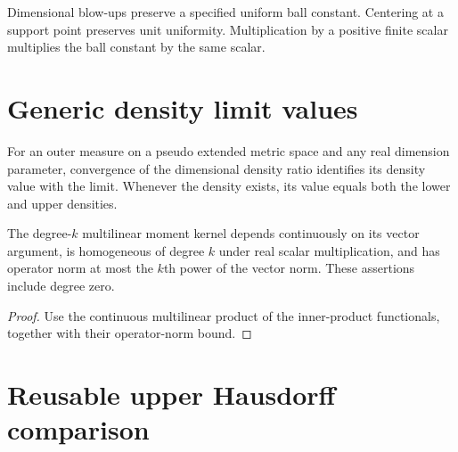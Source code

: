 \begin{lemma}
\label{lem:uniform-scaling}
Dimensional blow-ups preserve a specified uniform ball constant. Centering at a support point preserves unit uniformity. Multiplication by a positive finite scalar multiplies the ball constant by the same scalar.
\end{lemma}

\section{Generic density limit values}
\begin{lemma}
\label{lem:density-limit-values}
For an outer measure on a pseudo extended metric space and any real dimension parameter, convergence of the dimensional density ratio identifies its density value with the limit. Whenever the density exists, its value equals both the lower and upper densities.
\end{lemma}

\begin{lemma}
\label{lem:moment-kernel-calculus}
The degree-$k$ multilinear moment kernel depends continuously on its vector argument,
is homogeneous of degree $k$ under real scalar multiplication, and has operator norm
at most the $k$th power of the vector norm. These assertions include degree zero.
\end{lemma}
\begin{proof}
Use the continuous multilinear product of the inner-product functionals, together
with their operator-norm bound.
\end{proof}

\section{Reusable upper Hausdorff comparison}


